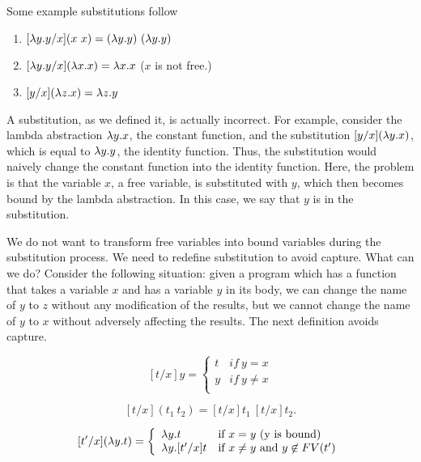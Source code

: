 \begin{example}
\label{xmpl:lambda::sub::basic}
Some example substitutions follow
\begin{enumerate}
\item $[\lambda y.y/x] (x~x)= (\lambda y.y)~(\lambda y.y)$

\item $[\lambda y.y/x] (\lambda x.x) = \lambda x.x$ ($x$ is not free.)

\item $[y/x](\lambda z.x) = \lambda z.y$

\end{enumerate}
\end{example}

\begin{gram}[Capture]
\label{grm:lambda::sub::capture}
A substitution, as we defined it, is actually incorrect.  For
example, consider the lambda abstraction $\lambda y.x$, the constant
function, and the substitution $[y/x](\lambda y.x)$, which is equal to $\lambda
y.y$, the identity function.  Thus, the substitution would naively
change the constant function into the identity function.  Here, the
problem is that the variable $x$, a free variable, is substituted with
$y$, which then becomes bound by the lambda abstraction.  In this
case, we say that $y$ is  in the substitution.
\end{gram}

We do not want to transform free variables into bound variables during
the substitution process.  We need to redefine substitution to avoid
capture. What can we do?  Consider the following situation: given a
program which has a function that takes a variable $x$ and has a
variable $y$ in its body, we can change the name of $y$ to $z$ without
any modification of the results, but we cannot change the name of $y$
to $x$ without adversely affecting the results. The next definition
avoids capture.
 
\begin{definition}
\label{def:lambda:sub::sub::avoid}
\[
[t/x]y = \left\{ \begin{array}{ll}
        t & if~y = x \\
        y & if~y\neq x \\
        \end{array} \right.
\]


\[
[t/x](t_1~t_2) = [t/x]t_1~[t/x]t_2.
 \]

\[
[t'/x](\lambda y.t) = 
\left\{ \begin{array}{ll}

\lambda y.t &\mbox{if}~ x = y \mbox{ (y is bound)} \\

\lambda y.[t'/x]t &\mbox{if}~ x \neq y \mbox { and } y \not \in FV(t') \\

\end{array} \right. 
\]
\end{definition}

